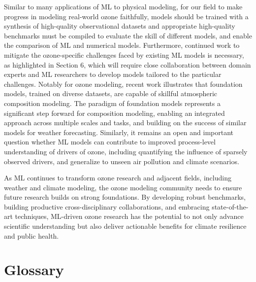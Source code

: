 \documentclass[gmd, manuscript]{copernicus}
\begin{document}
Similar to many applications of ML to physical modeling, for our field to make progress in modeling real-world ozone faithfully, models should be trained with a synthesis of high-quality observational datasets and appropriate high-quality benchmarks must be compiled to evaluate the skill of different models, and enable the comparison of ML and numerical models. Furthermore, continued work to mitigate the ozone-specific challenges faced by existing ML models is necessary, as highlighted in Section 6, which will require close collaboration between domain experts and ML researchers to develop models tailored to the particular challenges. Notably for ozone modeling, recent work illustrates that foundation models, trained on diverse datasets, are capable of skillful atmospheric composition modeling. The paradigm of foundation models represents a significant step forward for composition modeling, enabling an integrated approach across multiple scales and tasks, and building on the success of similar models for weather forecasting. Similarly, it remains an open and important question whether ML models can contribute to improved process-level understanding of drivers of ozone, including quantifying the influence of sparsely observed drivers, and generalize to unseen air pollution and climate scenarios.

As ML continues to transform ozone research and adjacent fields, including weather and climate modeling, the ozone modeling community needs to ensure future research builds on strong foundations. By developing robust benchmarks, building productive cross-disciplinary collaborations, and embracing state-of-the-art techniques, ML-driven ozone research has the potential to not only advance scientific understanding but also deliver actionable benefits for climate resilience and public health.








\appendix
\section{Glossary}    %
\end{document}
